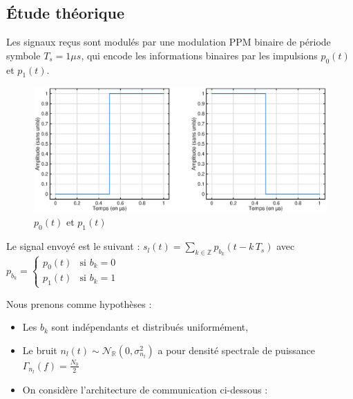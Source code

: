 \documentclass[a4paper, 10pt]{article}
\begin{document}
    \subsection{Étude théorique}
    Les signaux reçus sont modulés par une modulation PPM binaire de période symbole $T_s = 1 {\mu}{s}$, qui encode les informations binaires par les impulsions $p_0(t)$ et $p_1(t)$.
    
    \begin{figure}[h!]
    	    \centering
    	    \includegraphics[scale=0.5]{impulsions.eps}
            \caption{$p_0(t)$ et $p_1(t)$}
    \end{figure}
    \noindent
    Le signal envoyé est le suivant : $ s_l(t) = \displaystyle\sum_{k \in \mathbb{Z}}{p_{b_k}\left(t-k\,T_s\right)} $ avec $p_{b_k} = \left\{ \begin{array}{ll}
            p_0(t) & \mbox{si $b_k = 0$}\\
            p_1(t) & \mbox{si $b_k = 1$}\end{array} \right.$
    
    \vspace{11pt}
    \noindent
    Nous prenons comme hypothèses :
    \renewcommand{\labelitemi}{\textbullet}
    \renewcommand{\labelitemii}{$\star$}
    \begin{itemize}
        \item Les $b_k$ sont indépendants et distribués uniformément,
        \item Le bruit $n_l(t) \sim \mathcal{N}_{\mathbb{R}}(0, \sigma^2_{n_l})$ a pour densité spectrale de puissance $\Gamma_{n_l}(f) = \frac{N_0}{2}$
        \item On considère l'architecture de communication ci-dessous :
    \end{itemize}

    \vspace{11pt}
    
\end{document}
